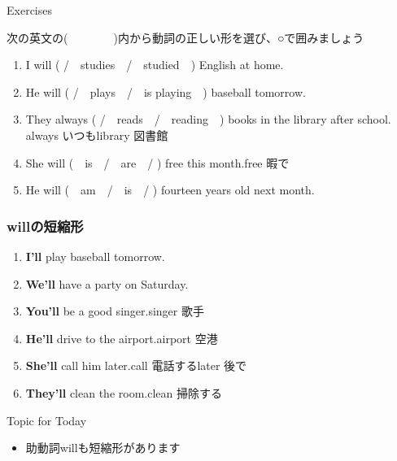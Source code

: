 \documentclass[aspectratio=169,xcolor={dvipsnames,table}]{beamer}
\newcommand{\myaudio}[1]{\href{#1}{\faVolumeUp}}
\begin{document}
\begin{frame}[plain]{Exercises}

次の英文の(~~~~~~~~)内から動詞の正しい形を選び、○で囲みましょう

\begin{enumerate}
 \item I will (   /~~studies~~/~~studied~~) English at home.
 \item He will (  /~~plays~~/~~is playing~~) baseball tomorrow.
 \item They always (   /~~reads~~/~~reading~~) books in the library after school.\\
\hfill{\scriptsize always  いつも\hspace{8pt}library  図書館}
 \item She will (~~is~~/~~are~~/  ) free this month.\hfill{\scriptsize free  暇で}
 \item He will (~~am~~/~~is~~/  ) fourteen years old next month.
\end{enumerate}
\mbox{}\hfill{\myaudio{./audio/012_will_03.mp3}} 
\end{frame}
\begin{frame}[plain]\frametitle{willの短縮形}


\begin{enumerate}
 \item {\bfseries I'll} play baseball tomorrow.
 \item {\bfseries We'll} have a party on Saturday.
 \item {\bfseries You'll} be a  good singer.\hfill{\scriptsize singer  歌手}
 \item {\bfseries He'll} drive to the airport.\hfill{\scriptsize airport  空港}
 \item {\bfseries She'll} call him later.\hfill{\scriptsize call  電話する\hspace{8pt}later  後で}
 \item {\bfseries They'll} clean the room.\hfill{\scriptsize clean  掃除する}
\end{enumerate}

\pause

\vfill

\begin{exampleblock}{Topic for Today}
\begin{itemize}[square]\small
 \item   助動詞willも短縮形があります
 \end{itemize}
     \end{exampleblock}

\mbox{}\hfill{\myaudio{./audio/012_will_03a.mp3}} 
\end{frame}
\end{document}
